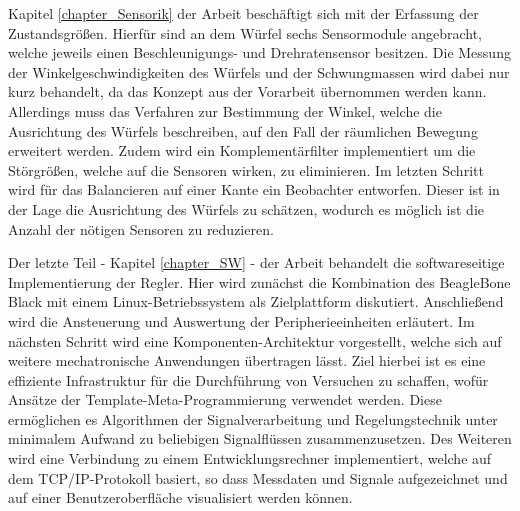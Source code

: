 Kapitel \ref{chapter_Sensorik} der Arbeit beschäftigt sich mit der Erfassung der Zustandsgrößen. Hierfür sind an dem Würfel sechs Sensormodule angebracht, welche jeweils einen Beschleunigungs- und Drehratensensor besitzen. Die Messung der Winkelgeschwindigkeiten des Würfels und der Schwungmassen wird dabei nur kurz behandelt, da das Konzept aus der Vorarbeit übernommen werden kann. Allerdings muss das Verfahren zur Bestimmung der Winkel, welche die Ausrichtung des Würfels beschreiben, auf den Fall der räumlichen Bewegung erweitert werden. Zudem wird ein Komplementärfilter implementiert um die Störgrößen, welche auf die Sensoren wirken, zu eliminieren. Im letzten Schritt wird für das Balancieren auf einer Kante ein Beobachter entworfen. Dieser ist in der Lage die Ausrichtung des Würfels zu schätzen, wodurch es möglich ist die Anzahl der nötigen Sensoren zu reduzieren.

Der letzte Teil - Kapitel \ref{chapter_SW} - der Arbeit behandelt die softwareseitige Implementierung der Regler. Hier wird zunächst die Kombination des BeagleBone Black mit einem Linux-Betriebssystem als Zielplattform diskutiert. Anschließend wird die Ansteuerung und Auswertung der Peripherieeinheiten erläutert. Im nächsten Schritt wird eine Komponenten-Architektur vorgestellt, welche sich auf weitere mechatronische Anwendungen übertragen lässt. Ziel hierbei ist es eine effiziente Infrastruktur für die Durchführung von Versuchen zu schaffen, wofür Ansätze der Template-Meta-Programmierung verwendet werden. Diese ermöglichen es Algorithmen der Signalverarbeitung und Regelungstechnik unter minimalem Aufwand zu beliebigen Signalflüssen zusammenzusetzen. Des Weiteren wird eine Verbindung zu einem Entwicklungsrechner implementiert, welche auf dem TCP/IP-Protokoll basiert, so dass Messdaten und Signale aufgezeichnet und auf einer Benutzeroberfläche visualisiert werden können.
